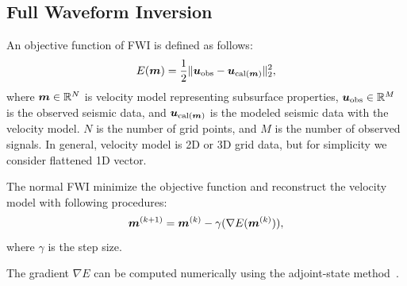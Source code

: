 \subsection{Full Waveform Inversion}\label{subsec:full-waveform-inversion}
An objective function of FWI is defined as follows\cite{FWI0}:
\begin{equation} \label{eq:FWIObjective} E(\bm{m}) = \frac {1} {2} \lVert  \bm{u}_{\mathrm{obs}} - \bm{u}_{\mathrm{cal}(\bm{m})}  \rVert _2^2, \end{equation}
where $\bm{m} \in \mathbb{R}^{N}$ is velocity model representing subsurface properties, $\bm{u}_{\mathrm{obs}} \in \mathbb{R}^{M}$ is the observed seismic data, and $\bm{u}_{\mathrm{cal}(\bm{m})}$ is the modeled seismic data with the velocity model.
$N$ is the number of grid points, and $M$ is the number of observed signals.
In general, velocity model is 2D or 3D grid data, but for simplicity we consider flattened 1D vector.

The normal FWI minimize the objective function and reconstruct the velocity model with following procedures:
\begin{equation} \label{eq:FWIWithGradient} \bm{m}^{(k+1)} = \bm{m}^{(k)} - \gamma( \nabla E(\bm{m}^{(k)}) ), \end{equation}
where $\gamma$ is the step size.

The gradient ${\nabla E}$ can be computed numerically using the adjoint-state method~\cite{FWI-gradient}.
